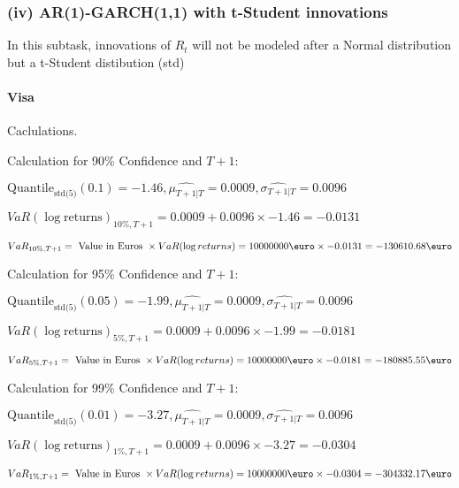 \subsubsection{(iv) AR(1)-GARCH(1,1) with t-Student innovations}
In this subtask, innovations of $R_t$ will not be modeled after a Normal distribution but a t-Student distibution (std) 

\paragraph{Visa} Caclulations.\newline \indent 




Calculation for 90\% Confidence and $T+1$:

\indent\indent $\text{Quantile}_\text{std(5)}(0.1) = -1.46,\hat{\mu_{T+1|T}} = 0.0009, \hat{\sigma_{T+1|T}} = 0.0096$

\indent\indent $VaR(\log \text{returns})_{10\%, T + 1} = 0.0009 + 0.0096\times-1.46 = -0.0131$

\indent\indent $VaR_{10\%, T + 1} = \text{ Value in Euros } \times VaR(\log returns) = 10 000 000 \text{\euro} \times-0.0131 = -130610.68 \text{\euro}$\newline




Calculation for 95\% Confidence and $T+1$:

\indent\indent $\text{Quantile}_\text{std(5)}(0.05) = -1.99,\hat{\mu_{T+1|T}} = 0.0009, \hat{\sigma_{T+1|T}} = 0.0096$

\indent\indent $VaR(\log \text{returns})_{5\%, T + 1} = 0.0009 + 0.0096\times-1.99 = -0.0181$

\indent\indent $VaR_{5\%, T + 1} = \text{ Value in Euros } \times VaR(\log returns) = 10 000 000 \text{\euro} \times-0.0181 = -180885.55 \text{\euro}$\newline




Calculation for 99\% Confidence and $T+1$:

\indent\indent $\text{Quantile}_\text{std(5)}(0.01) = -3.27,\hat{\mu_{T+1|T}} = 0.0009, \hat{\sigma_{T+1|T}} = 0.0096$

\indent\indent $VaR(\log \text{returns})_{1\%, T + 1} = 0.0009 + 0.0096\times-3.27 = -0.0304$

\indent\indent $VaR_{1\%, T + 1} = \text{ Value in Euros } \times VaR(\log returns) = 10 000 000 \text{\euro} \times-0.0304 = -304332.17 \text{\euro}$\newline





